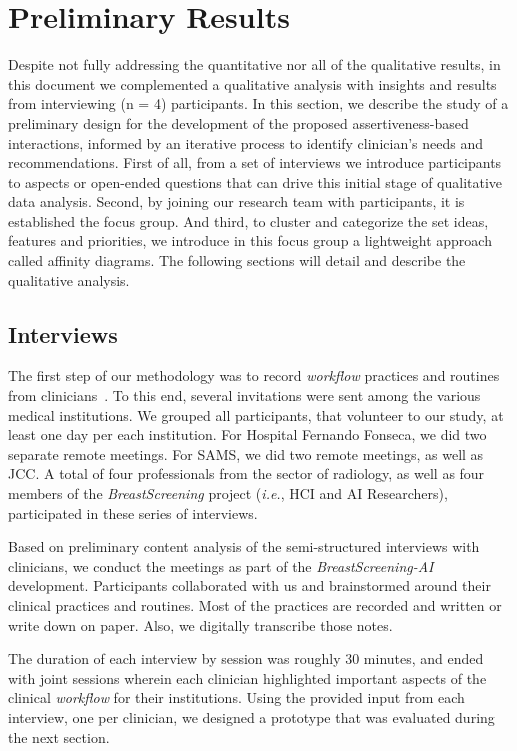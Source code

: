 \section{Preliminary Results}
\label{sec:sec005}

Despite not fully addressing the quantitative nor all of the qualitative results, in this document we complemented a qualitative analysis with insights and results from interviewing (n = 4) participants.
In this section, we describe the study of a preliminary design for the development of the proposed assertiveness-based interactions, informed by an iterative process to identify clinician's needs and recommendations.
First of all, from a set of interviews we introduce participants to aspects or open-ended questions that can drive this initial stage of qualitative data analysis.
Second, by joining our research team with participants, it is established the focus group.
And third, to cluster and categorize the set ideas, features and priorities, we introduce in this focus group a lightweight approach called affinity diagrams.
The following sections will detail and describe the qualitative analysis.

\subsection{Interviews}
\label{sec:sec00501}

The first step of our methodology was to record {\it workflow} practices and routines from clinicians~\cite{Hoiseth:2013:RGD:2468356.2468436}.
To this end, several invitations were sent among the various medical institutions.
We grouped all participants, that volunteer to our study, at least one day per each institution.
For Hospital Fernando Fonseca, we did two separate remote meetings.
For SAMS, we did two remote meetings, as well as JCC.
A total of four professionals from the sector of radiology, as well as four members of the {\it BreastScreening} project ({\it i.e.}, HCI and AI Researchers), participated in these series of interviews.

Based on preliminary content analysis of the semi-structu\-red interviews with clinicians, we conduct the meetings as part of the {\it BreastScreening-AI} development.
Participants collaborated with us and brainstormed around their clinical practices and routines.
Most of the practices are recorded and written or write down on paper.
Also, we digitally transcribe those notes.

The duration of each interview by session was roughly 30 minutes, and ended with joint sessions wherein each clinician highlighted important aspects of the clinical {\it workflow} for their institutions.
Using the provided input from each interview, one per clinician, we designed a prototype that was evaluated during the next section.

